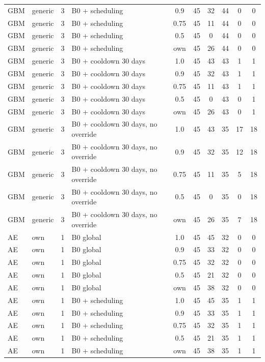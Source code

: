 \begin{longtable}{lllp{4.4cm}cccccc}
GBM & generic & 3 & B0 + scheduling & 0.9 & 45 & 32 & 44 & 0 & 0 \\
GBM & generic & 3 & B0 + scheduling & 0.75 & 45 & 11 & 44 & 0 & 0 \\
GBM & generic & 3 & B0 + scheduling & 0.5 & 45 & 0 & 44 & 0 & 0 \\
GBM & generic & 3 & B0 + scheduling & own & 45 & 26 & 44 & 0 & 0 \\
GBM & generic & 3 & B0 + cooldown 30 days & 1.0 & 45 & 43 & 43 & 1 & 1 \\
GBM & generic & 3 & B0 + cooldown 30 days & 0.9 & 45 & 32 & 43 & 1 & 1 \\
GBM & generic & 3 & B0 + cooldown 30 days & 0.75 & 45 & 11 & 43 & 1 & 1 \\
GBM & generic & 3 & B0 + cooldown 30 days & 0.5 & 45 & 0 & 43 & 0 & 1 \\
GBM & generic & 3 & B0 + cooldown 30 days & own & 45 & 26 & 43 & 0 & 1 \\
GBM & generic & 3 & B0 + cooldown 30 days, no override & 1.0 & 45 & 43 & 35 & 17 & 18 \\
GBM & generic & 3 & B0 + cooldown 30 days, no override & 0.9 & 45 & 32 & 35 & 12 & 18 \\
GBM & generic & 3 & B0 + cooldown 30 days, no override & 0.75 & 45 & 11 & 35 & 5 & 18 \\
GBM & generic & 3 & B0 + cooldown 30 days, no override & 0.5 & 45 & 0 & 35 & 0 & 18 \\
GBM & generic & 3 & B0 + cooldown 30 days, no override & own & 45 & 26 & 35 & 7 & 18 \\
AE & own & 1 & B0 global & 1.0 & 45 & 45 & 32 & 0 & 0 \\
AE & own & 1 & B0 global & 0.9 & 45 & 33 & 32 & 0 & 0 \\
AE & own & 1 & B0 global & 0.75 & 45 & 32 & 32 & 0 & 0 \\
AE & own & 1 & B0 global & 0.5 & 45 & 21 & 32 & 0 & 0 \\
AE & own & 1 & B0 global & own & 45 & 38 & 32 & 0 & 0 \\
AE & own & 1 & B0 + scheduling & 1.0 & 45 & 45 & 35 & 1 & 1 \\
AE & own & 1 & B0 + scheduling & 0.9 & 45 & 33 & 35 & 1 & 1 \\
AE & own & 1 & B0 + scheduling & 0.75 & 45 & 32 & 35 & 1 & 1 \\
AE & own & 1 & B0 + scheduling & 0.5 & 45 & 21 & 35 & 1 & 1 \\
AE & own & 1 & B0 + scheduling & own & 45 & 38 & 35 & 1 & 1 \\

\end{longtable}
